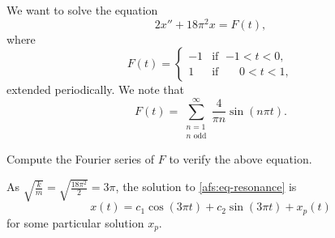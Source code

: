 \begin{example}
We want to solve the equation
\begin{equation} \label{afs:eq-resonance}
2 x'' + 18 \pi^2 x = F(t) ,
\end{equation}
where
\begin{equation*}
F(t) =
\begin{cases}
-1 & \text{if } \; {-1} < t < 0 , \\
1 & \text{if } \; \phantom{-}0 < t < 1 ,
\end{cases}
\end{equation*}
extended periodically.  We note that
\begin{equation*}
F(t) =
\sum_{\substack{n=1 \\ n \text{ odd}}}^\infty
\frac{4}{\pi n}
\sin (n \pi t) . 
\end{equation*}

\begin{exercise}
Compute the Fourier series of $F$ to verify the above equation.
\end{exercise}

As $\sqrt{\frac{k}{m}} = \sqrt{\frac{18\pi^2}{2}} = 3\pi$,
the solution to \eqref{afs:eq-resonance} is
\begin{equation*}
x(t) = c_1 \cos  (3\pi t) + c_2 \sin (3\pi t) + x_p (t)
\end{equation*}
for some particular solution $x_p$.


\end{example}
